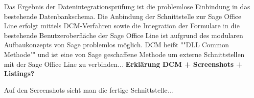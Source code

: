 Das Ergebnis der Datenintegrationsprüfung ist die problemlose Einbindung in das bestehende Datenbankschema. Die Anbindung der Schnittstelle zur Sage Office Line erfolgt mittels DCM-Verfahren sowie die Integration der Formulare in die bestehende Benutzeroberfläche der Sage Office Line ist aufgrund des modularen Aufbaukonzepts von Sage problemlos möglich. DCM heißt ""DLL Common Methode"" und ist eine von Sage geschaffene Methode um externe Schnittstellen mit der Sage Office Line zu verbinden... \textbf{Erklärung DCM + Screenshots + Listings?}

Auf den Screenshots sieht man die fertige Schnittstelle...